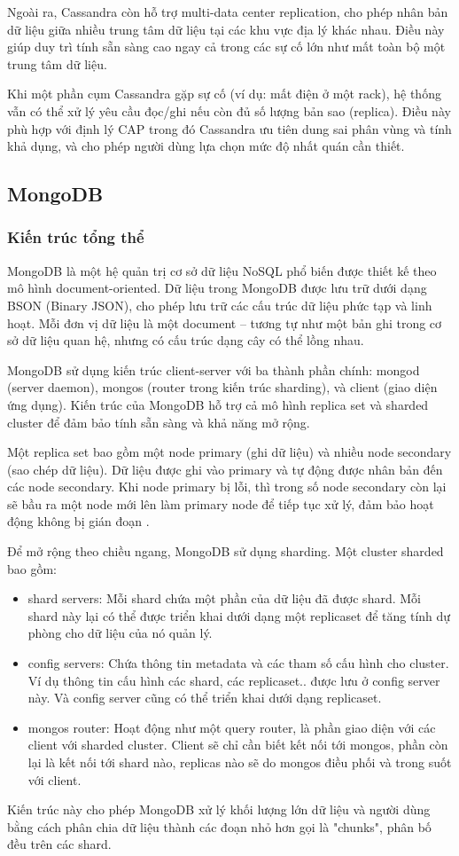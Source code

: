 \documentclass[conference]{IEEEtran}
\begin{document}
Ngoài ra, Cassandra còn hỗ trợ multi-data center replication, cho phép nhân bản dữ liệu giữa nhiều trung tâm dữ liệu tại các khu vực địa lý khác nhau. Điều này giúp duy trì tính sẵn sàng cao ngay cả trong các sự cố lớn như mất toàn bộ một trung tâm dữ liệu.

Khi một phần cụm Cassandra gặp sự cố (ví dụ: mất điện ở một rack), hệ thống vẫn có thể xử lý yêu cầu đọc/ghi nếu còn đủ số lượng bản sao (replica). Điều này phù hợp với định lý CAP trong đó Cassandra ưu tiên dung sai phân vùng và tính khả dụng, và cho phép người dùng lựa chọn mức độ nhất quán cần thiết.
\subsection{MongoDB}
\subsubsection{Kiến trúc tổng thể}
MongoDB là một hệ quản trị cơ sở dữ liệu NoSQL phổ biến được thiết kế theo mô hình document-oriented. Dữ liệu trong MongoDB được lưu trữ dưới dạng BSON (Binary JSON), cho phép lưu trữ các cấu trúc dữ liệu phức tạp và linh hoạt. Mỗi đơn vị dữ liệu là một document – tương tự như một bản ghi trong cơ sở dữ liệu quan hệ, nhưng có cấu trúc dạng cây có thể lồng nhau.

MongoDB sử dụng kiến trúc client-server với ba thành phần chính: mongod (server daemon), mongos (router trong kiến trúc sharding), và client (giao diện ứng dụng). Kiến trúc của MongoDB hỗ trợ cả mô hình replica set và sharded cluster để đảm bảo tính sẵn sàng và khả năng mở rộng.

Một replica set bao gồm một node primary (ghi dữ liệu) và nhiều node secondary (sao chép dữ liệu). Dữ liệu được ghi vào primary và tự động được nhân bản đến các node secondary. Khi node primary bị lỗi, thì trong số node secondary còn lại sẽ bầu ra một node mới lên làm primary node để tiếp tục xử lý, đảm bảo hoạt động không bị gián đoạn \cite{mongobook}.

Để mở rộng theo chiều ngang, MongoDB sử dụng sharding. Một cluster sharded bao gồm:
\begin{itemize}
    \item shard servers: Mỗi shard chứa một phần của dữ liệu đã được shard. Mỗi shard này lại có thể được triển khai dưới dạng một replicaset để tăng tính dự phòng cho dữ liệu của nó quản lý. 
    \item config servers: Chứa thông tin metadata và các tham số cấu hình cho cluster. Ví dụ thông tin cấu hình các shard, các replicaset.. được lưu ở config server này. Và config server cũng có thể triển khai dưới dạng replicaset. 
    \item mongos router: Hoạt động như một query router, là phần giao diện với các client với sharded cluster. Client sẽ chỉ cần biết kết nối tới mongos, phần còn lại là kết nối tới shard nào, replicas nào sẽ do mongos điều phối và trong suốt với client.\cite{mongodbsharding}
\end{itemize}
Kiến trúc này cho phép MongoDB xử lý khối lượng lớn dữ liệu và người dùng bằng cách phân chia dữ liệu thành các đoạn nhỏ hơn gọi là "chunks", phân bố đều trên các shard.
\end{document}
